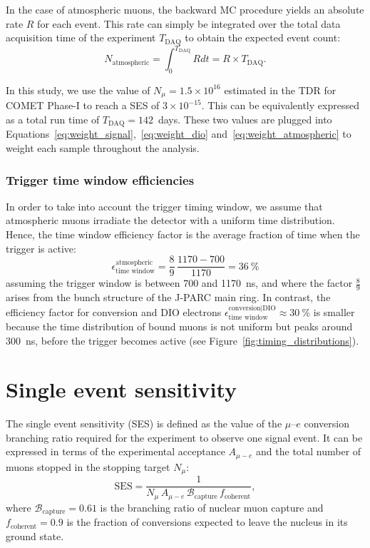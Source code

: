 In the case of atmospheric muons, the backward MC procedure yields an absolute
rate $R$ for each event. This rate can simply be integrated over the total
data acquisition time of the experiment $T_\mathrm{DAQ}$ to obtain the expected
event count:
\begin{equation}\label{eq:weight_atmospheric}
N_\mathrm{atmospheric} = \int_0^{T_\mathrm{DAQ}} R dt = R \times T_\mathrm{DAQ}.
\end{equation}

In this study, we use the value of $N_\mu = 1.5\times 10^{16}$ estimated in the
TDR for COMET Phase-I to reach a SES of $3\times 10^{-15}$. This can be
equivalently expressed as a total run time of $T_\mathrm{DAQ}=142$~days. These
two values are plugged into
Equations~\ref{eq:weight_signal},~\ref{eq:weight_dio}
and~\ref{eq:weight_atmospheric} to weight each sample throughout the analysis.




\subsubsection{Trigger time window efficiencies}
In order to take into account the trigger timing window, we assume that
atmospheric muons irradiate the detector with a uniform time distribution.
Hence, the time window efficiency factor is the average fraction of time when
the trigger is active:
$$
\epsilon_\text{time window}^\mathrm{atmospheric} =
\frac{8}{9}\,\frac{1170 - 700}{1170} = \SI{36}{\percent}
$$
assuming the trigger window is between 700 and \SI{1170}{\ns}, and where the
factor $\frac{8}{9}$ arises from the bunch structure of the J-PARC main ring. In
contrast, the efficiency factor for conversion and DIO electrons
$\epsilon_\text{time window}^\text{conversion|DIO} \approx \SI{30}{\percent}$ is
smaller because the time distribution of bound muons is not uniform but peaks
around \SI{300}{\ns}, before the trigger becomes active (see
Figure~\ref{fig:timing_distributions}).



\section{Single event sensitivity}
The single event sensitivity (SES) is defined as the value of the $\mu$--$e$
conversion branching ratio required for the experiment to observe one signal
event. It can be expressed in terms of the experimental acceptance $A_{\mu-e}$
and the total number of muons stopped in the stopping target $N_\mu$:
\begin{equation}
    \mathrm{SES} = \frac{1}{N_\mu\,A_{\mu-e}\,\mathcal{B}_\mathrm{capture}\,f_\mathrm{coherent}},
\end{equation}
where $\mathcal{B}_\mathrm{capture} = 0.61$ is the branching ratio of nuclear
muon capture and $f_\mathrm{coherent} = 0.9$ is the fraction of conversions
expected to leave the nucleus in its ground state.


